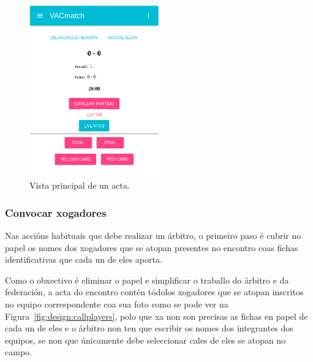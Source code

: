     \begin{figure}[h!]
      \begin{center}
      \includegraphics[width=0.5\textwidth]{./img/demo/8_report.png}
      \caption{Vista principal de un acta.}
      \label{fig:design:showreport}
      \end{center}
    \end{figure}

      \subsubsection{Convocar xogadores}
      Nas accións habituais que debe realizar un árbitro, o 
primeiro paso é cubrir no papel os nomes dos xogadores que se atopan presentes 
no encontro coas fichas identificativas que cada un de eles aporta.

      Como o obxectivo é eliminar o papel e simplificar o traballo do árbitro 
e da federación, a acta do encontro contén tódolos xogadores que 
se atopan inscritos no equipo correspondente coa sua foto como se pode ver na 
Figura~\ref{fig:design:callplayers}, polo que xa non son 
precisas as fichas en papel de cada un de eles e o árbitro non ten que escribir 
os nomes dos integrantes dos equipos, se non que únicamente debe seleccionar 
cales de eles se atopan no campo.

